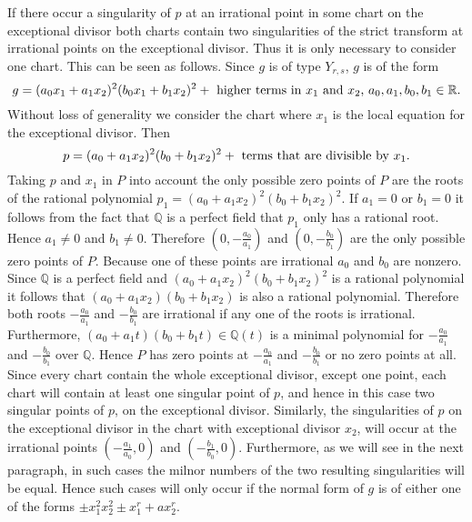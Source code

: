 \documentclass[noend]{amsproc}
\begin{document}
If there occur a singularity of $p$ at an irrational point in some chart on the
exceptional divisor both charts contain two singularities of the strict
transform at irrational points on the exceptional divisor. Thus it is only
necessary to consider one chart. This can be seen as follows. Since $g$ is of
type $Y_{r,s}$, $g$ is of the form
\[g=(a_0x_1+a_1x_2)^2(b_0x_1+b_1x_2)^2+\textnormal{ higher terms in $x_1$ and
$x_2$, $a_0,a_1,b_0,b_1\in\mathbb R$.}\] Without loss of generality we consider
the chart where $x_1$ is the local equation for the exceptional divisor. Then
\[p=(a_0+a_1x_2)^2(b_0+b_1x_2)^2+\textnormal{ terms that are divisible by
$x_1$.}\] Taking $p$ and $x_1$ in $P$ into account the only possible zero
points of $P$ are the roots of the rational polynomial $p_1 =
(a_0+a_1x_2)^2(b_0+b_1x_2)^2$. If $a_1=0$ or $b_1=0$ it follows from the fact
that $\mathbb Q$ is a perfect field that $p_1$ only has a rational root. Hence
$a_1\neq 0$ and $b_1\neq 0$. Therefore   $(0,-\frac{a_0}{a_1})$ and
$(0,-\frac{b_0}{b_1})$ are the only possible zero points of $P$. Because one of
these points are irrational $a_0$ and $b_0$ are nonzero. Since $\mathbb Q$ is a
perfect field and $(a_0+a_1x_2)^2(b_0+b_1x_2)^2$ is  a rational polynomial it
follows that $(a_0+a_1x_2)(b_0+b_1x_2)$ is also a rational polynomial.
Therefore both roots $-\frac{a_0}{a_1}$ and $-\frac{b_0}{b_1}$ are irrational
if any one of the roots is irrational. Furthermore,
$(a_0+a_1t)(b_0+b_1t)\in\mathbb Q(t)$ is a minimal polynomial for
$-\frac{a_0}{a_1}$ and $-\frac{b_0}{b_1}$ over $\mathbb Q$. Hence $P$ has zero
points at $-\frac{a_0}{a_1}$ and $-\frac{b_0}{b_1}$ or no zero points at all.
Since every chart contain the whole exceptional divisor, except one point, each
chart will contain at least one singular point of $p$, and hence in this case
two singular points of $p$, on the exceptional divisor. Similarly, the
singularities of $p$ on the exceptional divisor in the chart with exceptional
divisor $x_2$, will occur at the irrational points $(-\frac{a_1}{a_0},0)$ and
$(-\frac{b_1}{b_0},0)$. Furthermore, as we will see in the next paragraph, in
such cases the milnor numbers of the two resulting singularities will be equal.
Hence such cases will only occur if the normal form of $g$ is of either one of
the forms $\pm x_1^2x_2^2\pm x_1^r+ax_2^r$.
\end{document}
